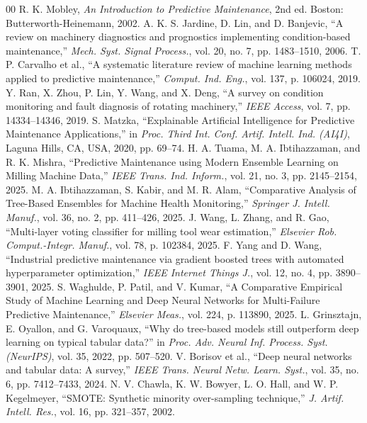\documentclass[conference]{IEEEtran}
\begin{document}
\begin{thebibliography}{00}
 R. K. Mobley, \textit{An Introduction to Predictive Maintenance}, 2nd ed. Boston: Butterworth-Heinemann, 2002.
 A. K. S. Jardine, D. Lin, and D. Banjevic, ``A review on machinery diagnostics and prognostics implementing condition-based maintenance,'' \textit{Mech. Syst. Signal Process.}, vol. 20, no. 7, pp. 1483--1510, 2006.
 T. P. Carvalho et al., ``A systematic literature review of machine learning methods applied to predictive maintenance,'' \textit{Comput. Ind. Eng.}, vol. 137, p. 106024, 2019.
 Y. Ran, X. Zhou, P. Lin, Y. Wang, and X. Deng, ``A survey on condition monitoring and fault diagnosis of rotating machinery,'' \textit{IEEE Access}, vol. 7, pp. 14334--14346, 2019.
 S. Matzka, ``Explainable Artificial Intelligence for Predictive Maintenance Applications,'' in \textit{Proc. Third Int. Conf. Artif. Intell. Ind. (AI4I)}, Laguna Hills, CA, USA, 2020, pp. 69--74.
 H. A. Tuama, M. A. Ibtihazzaman, and R. K. Mishra, ``Predictive Maintenance using Modern Ensemble Learning on Milling Machine Data,'' \textit{IEEE Trans. Ind. Inform.}, vol. 21, no. 3, pp. 2145--2154, 2025.
 M. A. Ibtihazzaman, S. Kabir, and M. R. Alam, ``Comparative Analysis of Tree-Based Ensembles for Machine Health Monitoring,'' \textit{Springer J. Intell. Manuf.}, vol. 36, no. 2, pp. 411--426, 2025.
 J. Wang, L. Zhang, and R. Gao, ``Multi-layer voting classifier for milling tool wear estimation,'' \textit{Elsevier Rob. Comput.-Integr. Manuf.}, vol. 78, p. 102384, 2025.
 F. Yang and D. Wang, ``Industrial predictive maintenance via gradient boosted trees with automated hyperparameter optimization,'' \textit{IEEE Internet Things J.}, vol. 12, no. 4, pp. 3890--3901, 2025.
 S. Waghulde, P. Patil, and V. Kumar, ``A Comparative Empirical Study of Machine Learning and Deep Neural Networks for Multi-Failure Predictive Maintenance,'' \textit{Elsevier Meas.}, vol. 224, p. 113890, 2025.
 L. Grinsztajn, E. Oyallon, and G. Varoquaux, ``Why do tree-based models still outperform deep learning on typical tabular data?'' in \textit{Proc. Adv. Neural Inf. Process. Syst. (NeurIPS)}, vol. 35, 2022, pp. 507--520.
 V. Borisov et al., ``Deep neural networks and tabular data: A survey,'' \textit{IEEE Trans. Neural Netw. Learn. Syst.}, vol. 35, no. 6, pp. 7412--7433, 2024.
 N. V. Chawla, K. W. Bowyer, L. O. Hall, and W. P. Kegelmeyer, ``SMOTE: Synthetic minority over-sampling technique,'' \textit{J. Artif. Intell. Res.}, vol. 16, pp. 321--357, 2002.

\end{thebibliography}
\end{document}
